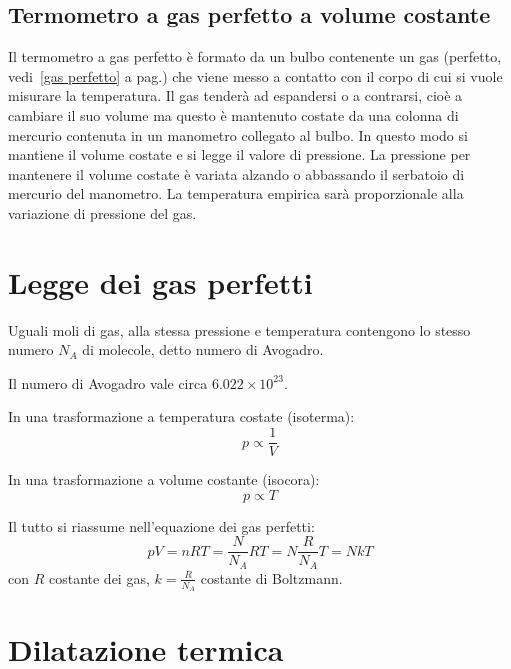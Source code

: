 \subsection{Termometro a gas perfetto a volume costante}
Il termometro a gas perfetto è formato da un bulbo contenente un gas (perfetto, vedi~\ref{gas perfetto} a pag.\@ \pageref{gas perfetto}) che viene messo a contatto con il corpo di cui si vuole misurare la temperatura. Il gas tenderà ad espandersi o a contrarsi, cioè a cambiare il suo volume ma questo è mantenuto costate da una colonna di mercurio contenuta in un manometro collegato al bulbo. In questo modo si mantiene il volume costate e si legge il valore di pressione. La pressione per mantenere il volume costate è variata alzando o abbassando il serbatoio di mercurio del manometro. La temperatura empirica sarà proporzionale alla variazione di pressione del gas.

\section{Legge dei gas perfetti}
\begin{legge}[Avogadro(1811)]
Uguali moli di gas, alla stessa pressione e temperatura contengono lo stesso numero $N_A$ di molecole, detto numero di Avogadro.
\end{legge}
Il numero di Avogadro vale circa $6.022\times 10^{23}$.
\begin{legge}
In una trasformazione a temperatura costate (isoterma):
\begin{equation}
p\propto\frac{1}{V}
\end{equation}
\end{legge}
\begin{legge}
In una trasformazione a volume costante (isocora):
\begin{equation}
p\propto{T}
\end{equation}
\end{legge}
Il tutto si riassume nell'equazione dei gas perfetti:
\begin{equation}
pV=nRT=\frac{N}{N_A}RT=N\frac{R}{N_A}T=NkT
\end{equation}
con $R$ costante dei gas, $k=\frac{R}{N_A}$ costante di Boltzmann.
\section{Dilatazione termica}
